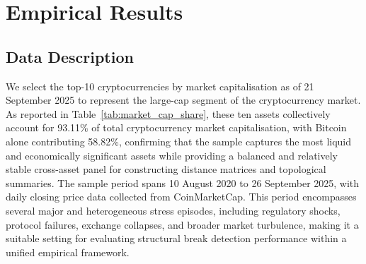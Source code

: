 \documentclass[11pt,reqno]{amsart}
\numberwithin{equation}{section} %
\begin{document}
\section{Empirical Results}\label{sec4}
\subsection{Data Description}

We select the top-10 cryptocurrencies by market capitalisation as of 21 September 2025 to represent the large-cap segment of the cryptocurrency market.
As reported in Table~\ref{tab:market_cap_share}, these ten assets collectively account for 93.11\% of total cryptocurrency market capitalisation, with Bitcoin alone contributing 58.82\%, confirming that the sample captures the most liquid and economically significant assets while providing a balanced and relatively stable cross-asset panel for constructing distance matrices and topological summaries. 
The sample period spans 10 August 2020 to 26 September 2025, with daily closing price data collected from CoinMarketCap. 
This period encompasses several major and heterogeneous stress episodes, including regulatory shocks, protocol failures, exchange collapses, and broader market turbulence, making it a suitable setting for evaluating structural break detection performance within a unified empirical framework.
\end{document}
